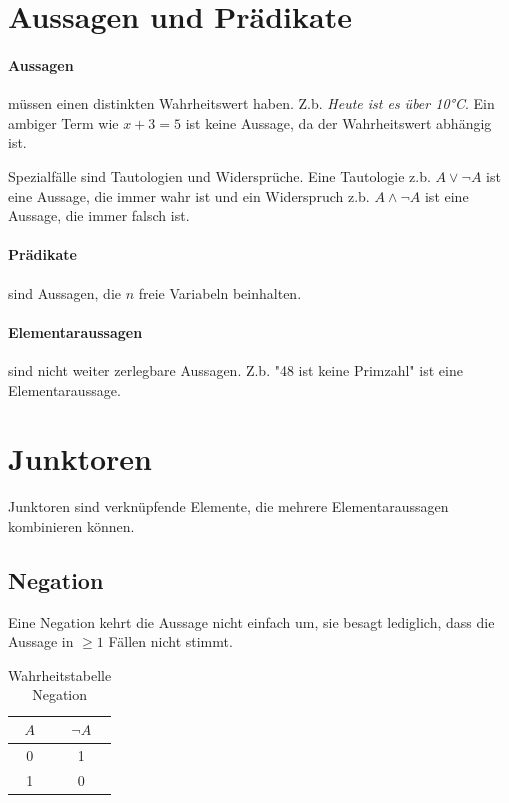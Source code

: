 \documentclass{article}
\author{Philipp Kiss}
\begin{document}

\section{Aussagen und Prädikate}
\paragraph{Aussagen} müssen einen distinkten Wahrheitswert haben.
Z.b. \textit{Heute ist es über 10°C}. Ein ambiger Term wie \(x+3=5\) ist keine Aussage, da der Wahrheitswert abhängig ist.

Spezialfälle sind Tautologien und Widersprüche. Eine Tautologie z.b. \(A \vee \neg A\) ist eine Aussage, die immer wahr ist und ein Widerspruch z.b. \(A \wedge \neg A\) ist eine Aussage, die immer falsch ist.

\paragraph{Prädikate}
sind Aussagen, die \(n\) freie Variabeln beinhalten.

\paragraph{Elementaraussagen} sind nicht weiter zerlegbare Aussagen.
Z.b. "48 ist keine Primzahl" ist eine Elementaraussage.
\section{Junktoren}
Junktoren sind verknüpfende Elemente, die mehrere Elementaraussagen kombinieren können.
\subsection{Negation}
Eine Negation kehrt die Aussage nicht einfach um, sie besagt lediglich, dass die Aussage in \(\geq 1\) Fällen nicht stimmt.
\begin{table}[h!]
		\begin{center}
				\caption{Wahrheitstabelle Negation}
				\label{tab:}
				\begin{tabular}{c|c}
						\(A\) & \(\neg A\) \\
						\hline
						0 & 1\\
						1 & 0\\
				\end{tabular}
		\end{center}
\end{table}
\end{document}
